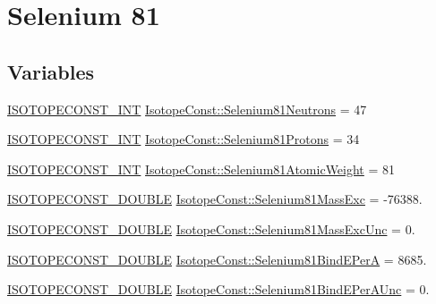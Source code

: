 \hypertarget{group___isotope_const-_selenium-_se81}{}\section{Selenium 81}
\label{group___isotope_const-_selenium-_se81}
\subsection*{Variables}
\begin{DoxyCompactItemize}
\item 
\mbox{\hyperlink{group___isotope_const-_macros_ga5f18360b3e99483a35c32d789e62621c}{I\+S\+O\+T\+O\+P\+E\+C\+O\+N\+S\+T\+\_\+\+I\+NT}} \mbox{\hyperlink{group___isotope_const-_selenium-_se81_ga8295fdcd620174107f1d0e2a44c8ee82}{Isotope\+Const\+::\+Selenium81\+Neutrons}} = 47
\item 
\mbox{\hyperlink{group___isotope_const-_macros_ga5f18360b3e99483a35c32d789e62621c}{I\+S\+O\+T\+O\+P\+E\+C\+O\+N\+S\+T\+\_\+\+I\+NT}} \mbox{\hyperlink{group___isotope_const-_selenium-_se81_gac7a095cc9a2a6d03155a55fde47aa235}{Isotope\+Const\+::\+Selenium81\+Protons}} = 34
\item 
\mbox{\hyperlink{group___isotope_const-_macros_ga5f18360b3e99483a35c32d789e62621c}{I\+S\+O\+T\+O\+P\+E\+C\+O\+N\+S\+T\+\_\+\+I\+NT}} \mbox{\hyperlink{group___isotope_const-_selenium-_se81_gad16be2af0d2701851cf39afb9c05e55d}{Isotope\+Const\+::\+Selenium81\+Atomic\+Weight}} = 81
\item 
\mbox{\hyperlink{group___isotope_const-_macros_ga8f45a7272ce02c0b4c65c44636ed719a}{I\+S\+O\+T\+O\+P\+E\+C\+O\+N\+S\+T\+\_\+\+D\+O\+U\+B\+LE}} \mbox{\hyperlink{group___isotope_const-_selenium-_se81_gab0be4fb60ebd25ed2d25cd4f9cc15691}{Isotope\+Const\+::\+Selenium81\+Mass\+Exc}} = -\/76388.
\item 
\mbox{\hyperlink{group___isotope_const-_macros_ga8f45a7272ce02c0b4c65c44636ed719a}{I\+S\+O\+T\+O\+P\+E\+C\+O\+N\+S\+T\+\_\+\+D\+O\+U\+B\+LE}} \mbox{\hyperlink{group___isotope_const-_selenium-_se81_ga67528d288f5090771c9e4ad32b97a43e}{Isotope\+Const\+::\+Selenium81\+Mass\+Exc\+Unc}} = 0.
\item 
\mbox{\hyperlink{group___isotope_const-_macros_ga8f45a7272ce02c0b4c65c44636ed719a}{I\+S\+O\+T\+O\+P\+E\+C\+O\+N\+S\+T\+\_\+\+D\+O\+U\+B\+LE}} \mbox{\hyperlink{group___isotope_const-_selenium-_se81_ga20f6f1a65571409461471ad23e7c7956}{Isotope\+Const\+::\+Selenium81\+Bind\+E\+PerA}} = 8685.
\item 
\mbox{\hyperlink{group___isotope_const-_macros_ga8f45a7272ce02c0b4c65c44636ed719a}{I\+S\+O\+T\+O\+P\+E\+C\+O\+N\+S\+T\+\_\+\+D\+O\+U\+B\+LE}} \mbox{\hyperlink{group___isotope_const-_selenium-_se81_ga60a1873458cbda77e3e1a6fc384feabe}{Isotope\+Const\+::\+Selenium81\+Bind\+E\+Per\+A\+Unc}} = 0.

\end{DoxyCompactItemize}

